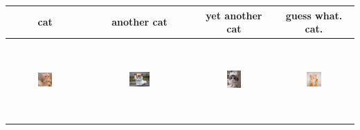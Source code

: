 \documentclass[10pt,a4paper]{report}
\begin{document}
\begin{tabular}{c | c | c | c}
    cat & another cat & yet another cat & guess what. cat. \\ \hline
    \includegraphics[width=0.2\textwidth, height=30mm]{images/1.jpg} & \includegraphics[width=0.2\textwidth, height=30mm]{images/2.jpg} & \includegraphics[width=0.2\textwidth, height=30mm]{images/3.jpg} & \includegraphics[width=0.2\textwidth, height=30mm]{images/4.jpg} \\
\end{tabular} \\
\end{document}
